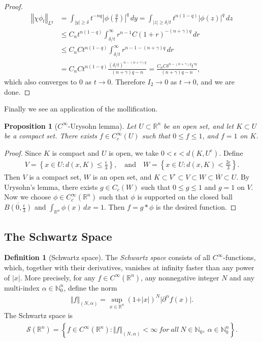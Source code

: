 \documentclass{article}
\numberwithin{equation}{section}
\newcommand{\bbN}{\mathbb{N}}
\newcommand{\bbR}{\mathbb{R}}
\renewcommand{\cal}{\mathcal}
\newcommand{\ol}{\overline}
\theoremstyle{plain}
\newtheorem{proposition}[theorem]{Proposition}
\theoremstyle{definition}
\newtheorem{definition}[theorem]{Definition}
\begin{document}
\begin{proof}
\begin{align*}
	\left\Vert\chi\phi_t\right\Vert_{L^q}&=\int_{\vert y\vert\geq\delta}t^{-nq}\left\vert\phi\left(\frac{y}{t}\right)\right\vert^q\,dy=\int_{\vert z\vert\geq\delta/t}t^{n(1-q)}\left\vert\phi\left(z\right)\right\vert^q\,dz\\
	&\leq C_n t^{n(1-q)}\int_{\delta/t}^\infty r^{n-1}C(1+r)^{-(n+\gamma)q}\,dr\\
	&\leq  C_nC t^{n(1-q)}\int_{\delta/t}^\infty r^{n-1-(n+\gamma)q}\,dr\\
	&=C_nC t^{n(1-q)}\frac{(\delta/t)^{n-(n+\gamma)q}}{(n+\gamma)q-n}=\frac{C_nC\delta^{n-(n+\gamma)q}t^{\gamma q}}{(n+\gamma)q-n},
\end{align*}
which also converges to $0$ as $t\to 0$. Therefore $I_2\to 0$ as $t\to 0$, and we are done.
\end{proof}


Finally we see an application of the mollification.
\begin{proposition}[$C^\infty$-Urysohn lemma]\label{cinfurysohn}
Let $U\subset\bbR^n$ be an open set, and let $K\subset U$ be a compact set. There exists $f\in C_c^\infty(U)$ such that $0\leq f\leq 1$, and $f=1$ on $K$.
\end{proposition}
\begin{proof}
Since $K$ is compact and $U$ is open, we take $0<\epsilon<d(K,U^c)$. Define
\begin{align*}
	V=\left\{x\in U:d(x,K)\leq\frac{\epsilon}{3}\right\},\quad\text{and}\quad W=\left\{x\in U:d(x,K)<\frac{2\epsilon}{3}\right\}.
\end{align*}
Then $V$ is a compact set, $W$ is an open set, and $K\subset V^\circ\subset V\subset W\subset\ol{W}\subset U$. By Urysohn's lemma, there exists $g\in C_c(W)$ such that $0\leq g\leq 1$ and $g=1$ on $V$. Now we choose $\phi\in C_c^\infty(\bbR^n)$ such that $\phi$ is supported on the closed ball $\ol{B(0,\frac{\epsilon}{3})}$ and $\int_{\bbR^n}\phi(x)\,dx=1$. Then $f=g*\phi$ is the desired function.
\end{proof}

\subsection{The Schwartz Space}
\begin{definition}[Schwartz space]
The \textit{Schwartz space} consists of all $C^\infty$-functions, which, together with their derivatives, vanishes at infinity faster than any power of $\vert x\vert$. More precisely, for any $f\in C^\infty(\bbR^n)$, any nonnegative integer $N$ and any multi-index $\alpha\in\bbN_0^n$, define the norm
\begin{align*}
	\Vert f\Vert_{(N,\alpha)}=\sup_{x\in\bbR^n}(1+\vert x\vert)^N\vert \partial^\alpha f(x)\vert.
\end{align*}
The Schwartz space is
\begin{align*}
	\cal{S}(\bbR^n)=\left\{f\in C^\infty(\bbR^n):\Vert f\Vert_{(N,\alpha)}<\infty\ for\ all\ N\in\bbN_0,\ \alpha\in\bbN_0^n\right\}.
\end{align*}
\end{definition}
\end{document}
